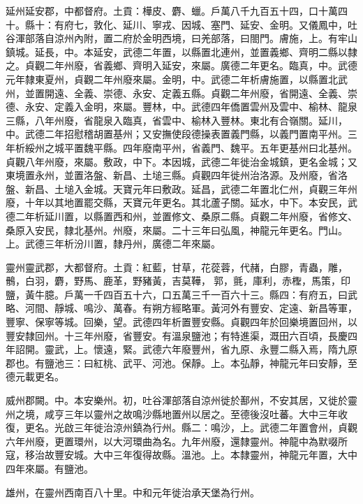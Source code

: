 \begin{pinyinscope}
 延州延安郡，中都督府。土貢：樺皮、麝、蠟。戶萬八千九百五十四，口十萬四十。縣十：有府七，敦化、延川、寧戎、因城、塞門、延安、金明。又儀鳳中，吐谷渾部落自涼州內附，置二府於金明西境，曰羌部落，曰閤門。膚施，上。有牢山鎮城。延長，中。本延安，武德二年置，以縣置北連州，並置義鄉、齊明二縣以隸之。貞觀二年州廢，省義鄉、齊明入延安，來屬。廣德二年更名。臨真，中。武德元年隸東夏州，貞觀二年州廢來屬。金明，中。武德二年析膚施置，以縣置北武州，並置開遠、全義、崇德、永安、定義五縣。貞觀二年州廢，省開遠、全義、崇德、永安、定義入金明，來屬。豐林，中。武德四年僑置雲州及雲中、榆林、龍泉三縣，八年州廢，省龍泉入臨真，省雲中、榆林入豐林。東北有合嶺關。延川，中。武德二年招慰稽胡置基州；又安撫使段德操表置義門縣，以義門置南平州。三年析綏州之城平置魏平縣。四年廢南平州，省義門、魏平。五年更基州曰北基州。貞觀八年州廢，來屬。敷政，中下。本因城，武德二年徙治金城鎮，更名金城；又東境置永州，並置洛盤、新昌、土塠三縣。貞觀四年徙州治洛源。及州廢，省洛盤、新昌、土塠入金城。天寶元年曰敷政。延昌，武德二年置北仁州，貞觀三年州廢，十年以其地置罷交縣，天寶元年更名。其北蘆子關。延水，中下。本安民，武德二年析延川置，以縣置西和州，並置修文、桑原二縣。貞觀二年州廢，省修文、桑原入安民，隸北基州。州廢，來屬。二十三年曰弘風，神龍元年更名。門山。上。武德三年析汾川置，隸丹州，廣德二年來屬。



 靈州靈武郡，大都督府。土貢：紅藍，甘草，花蓯蓉，代赭，白膠，青蟲，雕，鶻，白羽，麝，野馬、鹿革，野豬黃，吉莫鞾，郭，氈，庫利，赤檉，馬策，印鹽，黃牛臆。戶萬一千四百五十六，口五萬三千一百六十三。縣四：有府五，曰武略、河間、靜城、鳴沙、萬春。有朔方經略軍。黃河外有豐安、定遠、新昌等軍，豐寧、保寧等城。回樂，望。武德四年析置豐安縣。貞觀四年於回樂境置回州，以豐安隸回州。十三年州廢，省豐安。有溫泉鹽池；有特進渠，溉田六百頃，長慶四年詔開。靈武，上。懷遠，緊。武德六年廢豐州，省九原、永豐二縣入焉，隋九原郡也。有鹽池三：曰紅桃、武平、河池。保靜。上。本弘靜，神龍元年曰安靜，至德元載更名。



 威州郡闕。中。本安樂州。初，吐谷渾部落自涼州徙於鄯州，不安其居，又徙於靈州之境，咸亨三年以靈州之故鳴沙縣地置州以居之。至德後沒吐蕃。大中三年收復，更名。光啟三年徙治涼州鎮為行州。縣二：鳴沙，上。武德二年置會州，貞觀六年州廢，更置環州，以大河環曲為名。九年州廢，還隸靈州。神龍中為默啜所寇，移治故豐安城。大中三年復得故縣。溫池。上。本隸靈州，神龍元年置，大中四年來屬。有鹽池。



 雄州，在靈州西南百八十里。中和元年徙治承天堡為行州。




\end{pinyinscope}
